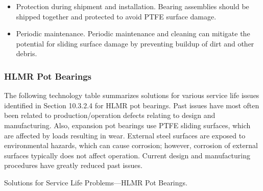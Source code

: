 \begin{itemize}
  \item Protection during shipment and installation. Bearing assemblies should be shipped together and protected to
  avoid PTFE surface damage.
  \item Periodic maintenance. Periodic maintenance and cleaning can mitigate the potential for sliding surface
  damage by preventing buildup of dirt and other debris.
\end{itemize}

\subsubsection{HLMR Pot Bearings}
The following technology table summarizes solutions for various service life issues identified in Section 10.3.2.4
for HLMR pot bearings. Past issues have most often been related to production/operation defects relating to design
and manufacturing. Also, expansion pot bearings use PTFE sliding surfaces, which are affected by loads resulting in
wear. External steel surfaces are exposed to environmental hazards, which can cause corrosion; however, corrosion
of external surfaces typically does not affect operation. Current design and manufacturing procedures have greatly
reduced past issues.

\begin{table}
  \caption{Solutions for Service Life Problems—HLMR Pot Bearings.}
  \label{tab:solution-bearing-hlmrpot}
\end{table}

